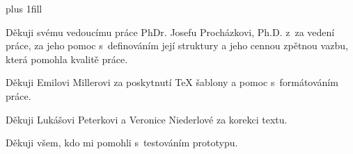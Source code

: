 \vglue 0pt plus 1fill

Děkuji svému vedoucímu práce PhDr. Josefu Procházkovi, Ph.D. z~za vedení práce, za jeho pomoc s~definováním její struktury a jeho cennou zpětnou vazbu, která pomohla kvalitě práce.

Děkuji Emilovi Millerovi za poskytnutí TeX šablony a pomoc s~formátováním práce.

Děkuji Lukášovi Peterkovi a Veronice Niederlové za korekci textu.

Děkuji všem, kdo mi pomohli s~testováním prototypu.

\vspace{20mm}
\newpage

